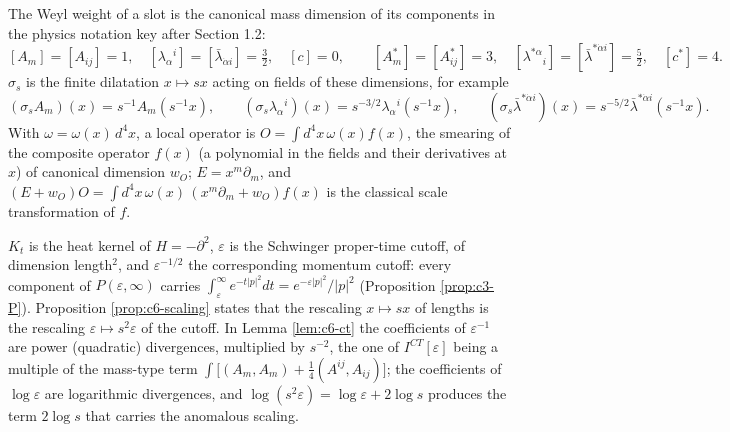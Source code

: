 \begin{remark}
The Weyl weight of a slot is the canonical mass dimension of its components in the physics notation key after Section 1.2:
\[
[A_m]=[A_{ij}]=1,\quad [\lambda_\alpha{}^i]=[\bar\lambda_{\dot\alpha i}]=\tfrac32,\quad [c]=0,\qquad [A^*_m]=[A^*_{ij}]=3,\quad [\lambda^{*\alpha}{}_i]=[\bar\lambda^{*\dot\alpha i}]=\tfrac52,\quad [c^*]=4 .
\]
$\sigma_s$ is the finite dilatation $x\mapsto sx$ acting on fields of these dimensions, for example
\[
(\sigma_sA_m)(x)=s^{-1}A_m(s^{-1}x),\qquad (\sigma_s\lambda_\alpha{}^i)(x)=s^{-3/2}\lambda_\alpha{}^i(s^{-1}x),\qquad (\sigma_s\bar\lambda^{*\dot\alpha i})(x)=s^{-5/2}\bar\lambda^{*\dot\alpha i}(s^{-1}x).
\]
With $\omega=\omega(x)\,d^4x$, a local operator is $O=\int d^4x\,\omega(x)f(x)$, the smearing of the composite operator $f(x)$ (a polynomial in the fields and their derivatives at $x$) of canonical dimension $w_O$; $E=x^m\partial_m$, and $(E+w_O)O=\int d^4x\,\omega(x)\,(x^m\partial_m+w_O)f(x)$ is the classical scale transformation of $f$.
\end{remark}

\begin{remark}
$K_t$ is the heat kernel of $H=-\partial^2$, $\varepsilon$ is the Schwinger proper-time cutoff, of dimension length$^2$, and $\varepsilon^{-1/2}$ the corresponding momentum cutoff: every component of $P(\varepsilon,\infty)$ carries $\int_\varepsilon^\infty e^{-t|p|^2}dt=e^{-\varepsilon|p|^2}/|p|^2$ (Proposition \ref{prop:c3-P}). Proposition \ref{prop:c6-scaling} states that the rescaling $x\mapsto sx$ of lengths is the rescaling $\varepsilon\mapsto s^2\varepsilon$ of the cutoff. In Lemma \ref{lem:c6-ct} the coefficients of $\varepsilon^{-1}$ are power (quadratic) divergences, multiplied by $s^{-2}$, the one of $I^{CT}[\varepsilon]$ being a multiple of the mass-type term $\int\big[(A_m,A_m)+\tfrac14(A^{ij},A_{ij})\big]$; the coefficients of $\log\varepsilon$ are logarithmic divergences, and $\log(s^2\varepsilon)=\log\varepsilon+2\log s$ produces the term $2\log s$ that carries the anomalous scaling.
\end{remark}

